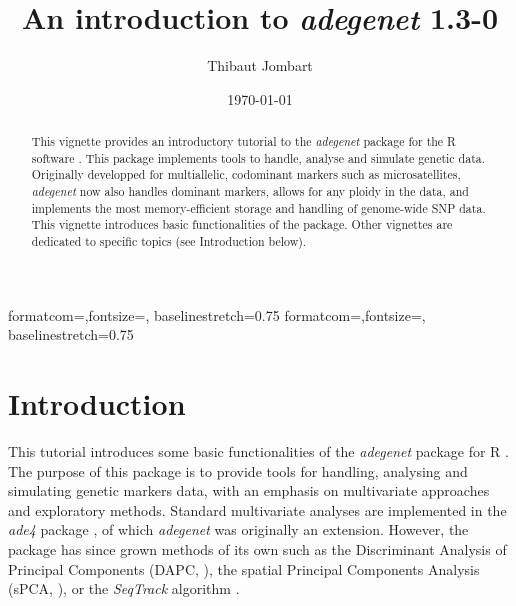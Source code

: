 \documentclass{article}
\title{An introduction to \textit{adegenet} 1.3-0}
\author{Thibaut Jombart}
\date{\today}
\begin{document}
{formatcom={\color{Sinput}},fontsize=\footnotesize, baselinestretch=0.75}
{formatcom={\color{Soutput}},fontsize=\footnotesize, baselinestretch=0.75}

\color{black}

\maketitle

\begin{abstract}
  This vignette provides an introductory tutorial to the \textit{adegenet} package \cite{tjart05}
  for the R software \cite{np145}. This package implements tools to handle, analyse and simulate
  genetic data.  Originally developped for multiallelic, codominant markers such as microsatellites,
  \textit{adegenet} now also handles dominant markers, allows for any ploidy in the data, and
  implements the most memory-efficient storage and handling of genome-wide SNP data. This vignette
  introduces basic functionalities of the package. Other vignettes are dedicated to specific topics
  (see Introduction below).
\end{abstract}


\newpage
\tableofcontents




\newpage
\section{Introduction}
This tutorial introduces some basic functionalities of the \textit{adegenet} package for R \cite{np145}.
The purpose of this package is to provide tools for handling, analysing and simulating genetic
markers data, with an emphasis on multivariate approaches and exploratory methods.
Standard multivariate analyses are implemented in the \textit{ade4} package \cite{tj548}, of which
\textit{adegenet} was originally an extension.
However, the package has since grown methods of its own such as the Discriminant Analysis of
Principal Components (DAPC, \cite{tjart19}), the spatial Principal Components Analysis (sPCA,
\cite{tjart04}), or the \textit{SeqTrack} algorithm \cite{tjart20}.
\end{document}
